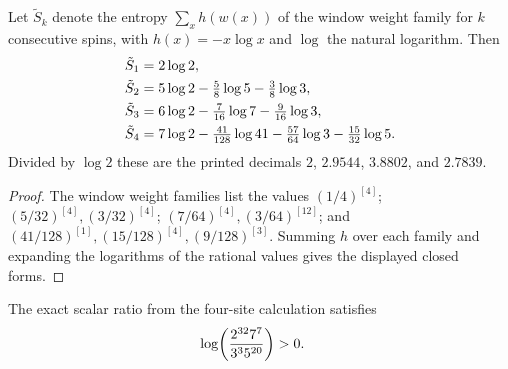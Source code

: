 \begin{lemma}
    \label{thm:cpsv_example410_window_entropies}
    \leanok
    Let $\tilde S_k$ denote the entropy $\sum_x h(w(x))$ of the window
    weight family for $k$ consecutive spins, with $h(x)=-x\log x$ and $\log$
    the natural logarithm.  Then
    \begin{align}
        \tilde S_1 & =2\log 2,\notag                                     \\
        \tilde S_2 & =5\log 2-\tfrac58\log 5-\tfrac38\log 3,\notag       \\
        \tilde S_3 & =6\log 2-\tfrac7{16}\log 7-\tfrac9{16}\log 3,\notag \\
        \tilde S_4 & =7\log 2-\tfrac{41}{128}\log 41
        -\tfrac{57}{64}\log 3-\tfrac{15}{32}\log 5.
        \notag
    \end{align}
    Divided by $\log 2$ these are the printed decimals $2$, $2.9544$,
    $3.8802$, and $2.7839$.
\end{lemma}

\begin{proof}
    \leanok
    The window weight families list the values
    $(1/4)^{[4]}$; $(5/32)^{[4]},(3/32)^{[4]}$;
    $(7/64)^{[4]},(3/64)^{[12]}$; and
    $(41/128)^{[1]},(15/128)^{[4]},(9/128)^{[3]}$.
    Summing $h$ over each family and expanding the logarithms of the
    rational values gives the displayed closed forms.
\end{proof}

\begin{lemma}
    \label{thm:cpsv_example410_log_ratio_pos}
    \leanok
    The exact scalar ratio from the four-site calculation satisfies
    \begin{align}
        \log\!\left(
        \frac{2^{32}7^7}{3^3 5^{20}}
        \right) & >0. \notag
    \end{align}
\end{lemma}

